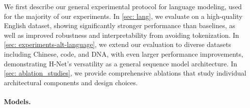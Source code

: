 \documentclass{article}
\theoremstyle{plain}
\theoremstyle{remark}
\begin{document}
We first describe our general experimental protocol for language modeling,  used for the majority of our experiments.
In \cref{sec: lang}, we evaluate on a high-quality English dataset, showing significantly stronger performance than baselines, as well as improved robustness and interpretability from avoiding tokenization.
In \cref{sec: experiments-alt-language}, we extend our evaluation to diverse datasets including Chinese, code, and DNA, with even larger performance improvements, demonstrating H-Net's versatility as a general sequence model architecture.
In \cref{sec: ablation_studies}, we provide comprehensive ablations that study individual architectural components and design choices.

\paragraph{Models.}
\end{document}
